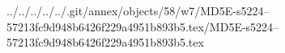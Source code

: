 ../../../../../.git/annex/objects/58/w7/MD5E-s5224--57213fc9d948b6426f229a4951b893b5.tex/MD5E-s5224--57213fc9d948b6426f229a4951b893b5.tex